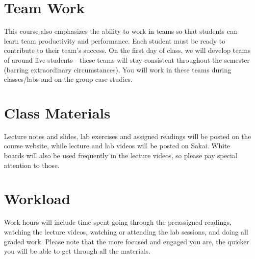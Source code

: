 \documentclass[11pt, a4paper]{article}
\begin{document}
\section{Team Work}
This course also emphasizes the ability to work in teams so that students can learn team productivity and performance. Each student must be ready to contribute to their team's success. On the first day of class, we will develop teams of around five students - these teams will stay consistent throughout the semester (barring extraordinary circumstances). You will work in these teams during classes/labs and on the group case studies.


\section{Class Materials}
Lecture notes and slides, lab exercises and assigned readings will be posted on the course website, while lecture and lab videos will be posted on Sakai. White boards will also be used frequently in the lecture videos, so please pay special attention to those.

\section{Workload}
Work hours will include time spent going through the preassigned readings, watching the lecture videos, watching or attending the lab sessions, and doing all graded work. Please note that the more focused and engaged you are, the quicker you will be able to get through all the materials.
\end{document}

